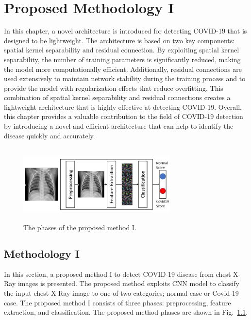 
\chapter{Proposed Methodology I} %

\label{chp:proposed1} %
In this chapter, a novel architecture is introduced for detecting COVID-19 that is designed to be lightweight. The architecture is based on two key components: spatial kernel separability and residual connection. By exploiting spatial kernel separability, the number of training parameters is significantly reduced, making the model more computationally efficient. Additionally, residual connections are used extensively to maintain network stability during the training process and to provide the model with regularization effects that reduce overfitting. This combination of spatial kernel separability and residual connections creates a lightweight architecture that is highly effective at detecting COVID-19. Overall, this chapter provides a valuable contribution to the field of COVID-19 detection by introducing a novel and efficient architecture that can help to identify the disease quickly and accurately. 

\begin{figure}[th]
    \centering
    \includegraphics[height=40mm,width=8.0cm]{Figures/fig1.jpg}
    \caption{The phases of the proposed method I.}
    \label{fig1}
    \end{figure}

\section{Methodology I}
In this section, a  proposed  method I to detect COVID-19 disease from chest X-Ray images is presented. The proposed method exploits CNN model to classify the input chest X-Ray image to one of two categories; normal case or Covid-19 case. The proposed  method I consists of three phases: preprocessing, feature extraction, and classification. The proposed method phases are shown in Fig.~\ref{fig1}. 

